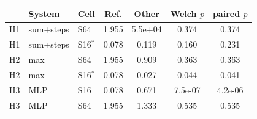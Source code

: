 \begin{tabular}{lllcccc}\toprule
 & System & Cell & Ref. & Other & Welch $p$ & paired $p$ \\\midrule
H1 & sum+steps & S64 & 1.955 & 5.5e+04 & 0.374 & 0.374 \\
H1 & sum+steps & S16$^\ast$ & 0.078 & 0.119 & 0.160 & 0.231 \\
H2 & max & S64 & 1.955 & 0.909 & 0.363 & 0.363 \\
H2 & max & S16$^\ast$ & 0.078 & 0.027 & 0.044 & 0.041 \\
H3 & MLP & S16 & 0.078 & 0.671 & 7.5e-07 & 4.2e-06 \\
H3 & MLP & S64 & 1.955 & 1.333 & 0.535 & 0.535 \\
\bottomrule\end{tabular}
